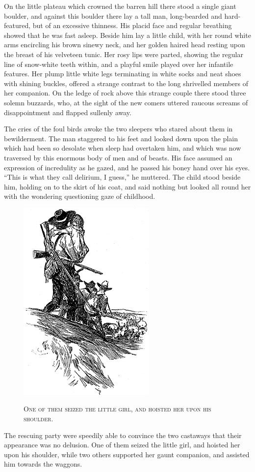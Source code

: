 \documentclass[12pt,english,oneside]{book}
\newcommand{\noun}[1]{\textsc{#1}}
\begin{document}
On the little plateau which crowned the barren hill there stood a
single giant boulder, and against this boulder there lay a tall man,
long-bearded and hard-featured, but of an excessive thinness. His
placid face and regular breathing showed that he was fast asleep.
Beside him lay a little child, with her round white arms encircling
his brown sinewy neck, and her golden haired head resting upon the
breast of his velveteen tunic. Her rosy lips were parted, showing
the regular line of snow-white teeth within, and a playful smile played
over her infantile features. Her plump little white legs terminating
in white socks and neat shoes with shining buckles, offered a strange
contrast to the long shrivelled members of her companion. On the ledge
of rock above this strange couple there stood three solemn buzzards,
who, at the sight of the new comers uttered raucous screams of disappointment
and flapped sullenly away.

The cries of the foul birds awoke the two sleepers who stared about
them in bewilderment. The man staggered to his feet and looked down
upon the plain which had been so desolate when sleep had overtaken
him, and which was now traversed by this enormous body of men and
of beasts. His face assumed an expression of incredulity as he gazed,
and he passed his boney hand over his eyes. {}``This is what they
call delirium, I guess,'' he muttered. The child stood beside him,
holding on to the skirt of his coat, and said nothing but looked all
round her with the wondering questioning gaze of childhood.

%
\begin{figure}[htbp]
\noindent \begin{center}\includegraphics{images/study10-stud-15.png}\end{center}

\noindent \begin{center}\noun{One of them seized the little girl,
and hoisted her upon his shoulder.}\end{center}
\end{figure}
The rescuing party were speedily able to convince the two castaways
that their appearance was no delusion. One of them seized the little
girl, and hoisted her upon his shoulder, while two others supported
her gaunt companion, and assisted him towards the waggons.
\end{document}
